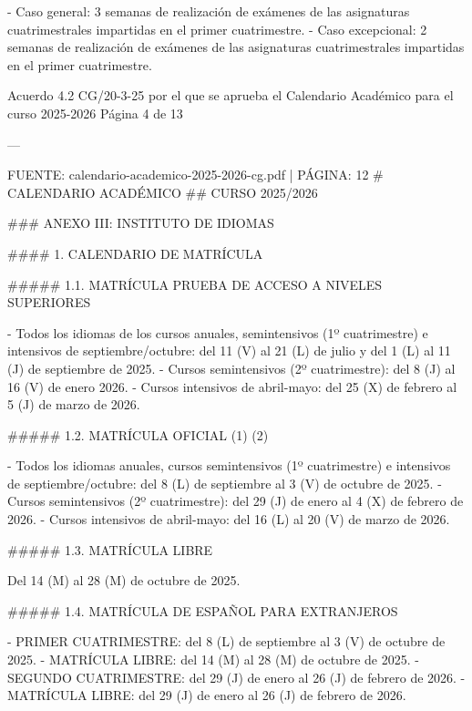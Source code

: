 \documentclass{article}
\begin{document}
\begin{itemize}
\begin{itemize}
\begin{scriptsize}
                  - Caso general: 3 semanas de realización de exámenes de las asignaturas cuatrimestrales impartidas en el primer cuatrimestre.
                  - Caso excepcional: 2 semanas de realización de exámenes de las asignaturas cuatrimestrales impartidas en el primer cuatrimestre.

                  Acuerdo 4.2 CG/20-3-25 por el que se aprueba el Calendario Académico para el curso 2025-2026  Página 4 de 13

                  ---

                  FUENTE: calendario-academico-2025-2026-cg.pdf | PÁGINA: 12
                  \# CALENDARIO ACADÉMICO
                  \#\# CURSO 2025/2026

                  \#\#\# ANEXO III: INSTITUTO DE IDIOMAS

                  \#\#\#\# 1. CALENDARIO DE MATRÍCULA

                  \#\#\#\#\# 1.1. MATRÍCULA PRUEBA DE ACCESO A NIVELES SUPERIORES

                  - Todos los idiomas de los cursos anuales, semintensivos (1º cuatrimestre) e intensivos de septiembre/octubre: del 11 (V) al 21 (L) de julio y del 1 (L) al 11 (J) de septiembre de 2025.
                  - Cursos semintensivos (2º cuatrimestre): del 8 (J) al 16 (V) de enero 2026.
                  - Cursos intensivos de abril-mayo: del 25 (X) de febrero al 5 (J) de marzo de 2026.

                  \#\#\#\#\# 1.2. MATRÍCULA OFICIAL (1) (2)

                  - Todos los idiomas anuales, cursos semintensivos (1º cuatrimestre) e intensivos de septiembre/octubre: del 8 (L) de septiembre al 3 (V) de octubre de 2025.
                  - Cursos semintensivos (2º cuatrimestre): del 29 (J) de enero al 4 (X) de febrero de 2026.
                  - Cursos intensivos de abril-mayo: del 16 (L) al 20 (V) de marzo de 2026.

                  \#\#\#\#\# 1.3. MATRÍCULA LIBRE

                  Del 14 (M) al 28 (M) de octubre de 2025.

                  \#\#\#\#\# 1.4. MATRÍCULA DE ESPAÑOL PARA EXTRANJEROS

                  - PRIMER CUATRIMESTRE: del 8 (L) de septiembre al 3 (V) de octubre de 2025.
                  - MATRÍCULA LIBRE: del 14 (M) al 28 (M) de octubre de 2025.
                  - SEGUNDO CUATRIMESTRE: del 29 (J) de enero al 26 (J) de febrero de 2026.
                  - MATRÍCULA LIBRE: del 29 (J) de enero al 26 (J) de febrero de 2026.


\end{scriptsize}
\end{itemize}
\end{itemize}
\end{document}

